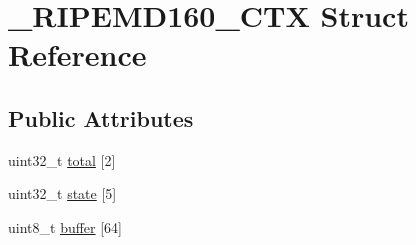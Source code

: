 \hypertarget{struct__RIPEMD160__CTX}{\section{\-\_\-\-R\-I\-P\-E\-M\-D160\-\_\-\-C\-T\-X Struct Reference}
\label{struct__RIPEMD160__CTX}
}
\subsection*{Public Attributes}
\begin{DoxyCompactItemize}
\item 
uint32\-\_\-t \hyperlink{struct__RIPEMD160__CTX_a2cbc656593e6b4a4b5611175cd798c39}{total} \mbox{[}2\mbox{]}
\item 
uint32\-\_\-t \hyperlink{struct__RIPEMD160__CTX_a1a4553dd5a4507fd12b2d93ae06aa0cc}{state} \mbox{[}5\mbox{]}
\item 
uint8\-\_\-t \hyperlink{struct__RIPEMD160__CTX_ac6b3e8f872dc74d2fa7ed5f592bc208e}{buffer} \mbox{[}64\mbox{]}
\end{DoxyCompactItemize}


